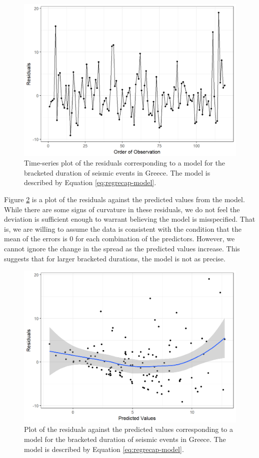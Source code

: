 \documentclass[]{book}
\theoremstyle{plain}
\theoremstyle{mydefn}
\theoremstyle{myexmpl}
\theoremstyle{remark}
\begin{document}
\begin{figure}

{\centering \includegraphics[width=0.8\linewidth]{./Images/regrecap-indep-1} 

}

\caption{Time-series plot of the residuals corresponding
to a model for the bracketed duration of seismic events in Greece. The
model is described by Equation \eqref{eq:regrecap-model}.}\label{fig:regrecap-indep}
\end{figure}

Figure \ref{fig:regrecap-mean0} is a plot of the residuals against the
predicted values from the model. While there are some signs of curvature
in these residuals, we do not feel the deviation is sufficient enough to
warrant believing the model is misspecified. That is, we are willing to
assume the data is consistent with the condition that the mean of the
errors is 0 for each combination of the predictors. However, we cannot
ignore the change in the spread as the predicted values increase. This
suggests that for larger bracketed durations, the model is not as
precise.






\begin{figure}

{\centering \includegraphics[width=0.8\linewidth]{./Images/regrecap-mean0-1} 

}

\caption{Plot of the residuals against the predicted
values corresponding to a model for the bracketed duration of seismic
events in Greece. The model is described by Equation
\eqref{eq:regrecap-model}.}\label{fig:regrecap-mean0}
\end{figure}
\end{document}
